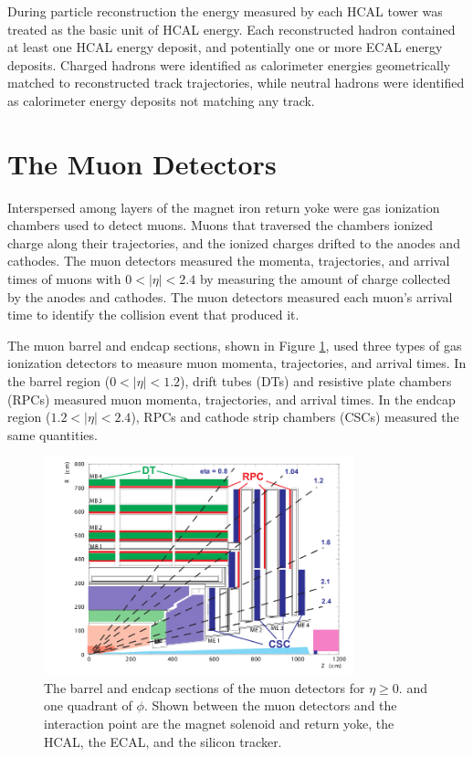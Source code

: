 During particle reconstruction the energy measured by each HCAL tower was treated as the basic unit of HCAL energy.  
Each reconstructed hadron contained at least one HCAL energy deposit, and potentially one or more ECAL energy 
deposits.  Charged hadrons were identified as calorimeter energies geometrically matched to reconstructed 
track trajectories, while neutral hadrons were identified as calorimeter energy deposits not matching any 
track.


\section{The Muon Detectors}
\label{sec:muonDetectorsDescription}
Interspersed among layers of the magnet iron return yoke were gas ionization chambers used to detect muons.  Muons 
that traversed the chambers ionized charge along their trajectories, and the ionized charges drifted to the 
anodes and cathodes.  The muon detectors measured the momenta, trajectories, and arrival times of muons with $0 < |\eta| < 2.4$ by 
measuring the amount of charge collected by the anodes and cathodes.  The muon detectors measured each muon's arrival 
time to identify the collision event that produced it.

The muon barrel and endcap sections, shown in Figure \ref{fig:muonBarrelAndEndcapDetectors}, used three types of 
gas ionization detectors to measure muon momenta, trajectories, and arrival times.  In the barrel region ($0 < |\eta| < 1.2$), 
drift tubes (DTs) and resistive plate chambers (RPCs) measured muon momenta, trajectories, and arrival times.  In 
the endcap region ($1.2 < |\eta| < 2.4$), RPCs and cathode strip chambers (CSCs) measured the same quantities.

\begin{figure}[ht]
	\centering
	\includegraphics[width=0.8\textwidth]{figures/muonDetectorLayout.png}
	\caption{The barrel and endcap sections of the muon detectors for $\eta \geq 0.$ and one quadrant of $\phi$.  Shown 
		between the muon detectors and the interaction point are the magnet solenoid and return yoke, the HCAL, the ECAL, 
		and the silicon tracker.}
	\label{fig:muonBarrelAndEndcapDetectors}
\end{figure}

